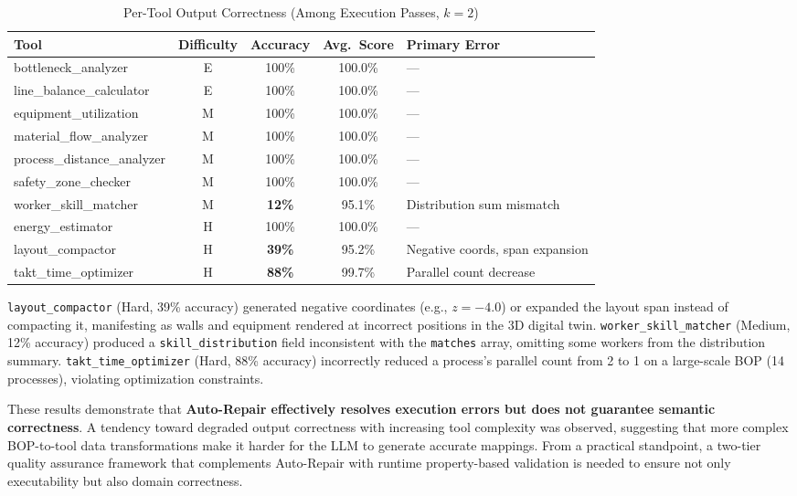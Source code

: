 \documentclass[conference]{IEEEtran}
\begin{document}
\begin{table}[!t]
\caption{Per-Tool Output Correctness (Among Execution Passes, $k{=}2$)}
\label{tab:tool_accuracy}
\centering
\begin{tabular}{l c c c l}
\hline
\textbf{Tool} & \textbf{Difficulty} & \textbf{Accuracy} & \textbf{Avg.\ Score} & \textbf{Primary Error} \\
\hline
bottleneck\_analyzer       & E & 100\% & 100.0\% & --- \\
line\_balance\_calculator  & E & 100\% & 100.0\% & --- \\
equipment\_utilization     & M & 100\% & 100.0\% & --- \\
material\_flow\_analyzer   & M & 100\% & 100.0\% & --- \\
process\_distance\_analyzer & M & 100\% & 100.0\% & --- \\
safety\_zone\_checker      & M & 100\% & 100.0\% & --- \\
worker\_skill\_matcher     & M & \textbf{12\%} & 95.1\% & Distribution sum mismatch \\
energy\_estimator          & H & 100\% & 100.0\% & --- \\
layout\_compactor          & H & \textbf{39\%} & 95.2\% & Negative coords, span expansion \\
takt\_time\_optimizer      & H & \textbf{88\%} & 99.7\% & Parallel count decrease \\
\hline
\end{tabular}
\end{table}

\texttt{layout\_compactor} (Hard, 39\% accuracy) generated negative coordinates (e.g., $z = -4.0$) or expanded the layout span instead of compacting it, manifesting as walls and equipment rendered at incorrect positions in the 3D digital twin. \texttt{worker\_skill\_matcher} (Medium, 12\% accuracy) produced a \texttt{skill\_distribution} field inconsistent with the \texttt{matches} array, omitting some workers from the distribution summary. \texttt{takt\_time\_optimizer} (Hard, 88\% accuracy) incorrectly reduced a process's parallel count from 2 to 1 on a large-scale BOP (14 processes), violating optimization constraints.

These results demonstrate that \textbf{Auto-Repair effectively resolves execution errors but does not guarantee semantic correctness}. A tendency toward degraded output correctness with increasing tool complexity was observed, suggesting that more complex BOP-to-tool data transformations make it harder for the LLM to generate accurate mappings. From a practical standpoint, a two-tier quality assurance framework that complements Auto-Repair with runtime property-based validation is needed to ensure not only executability but also domain correctness.
\end{document}
